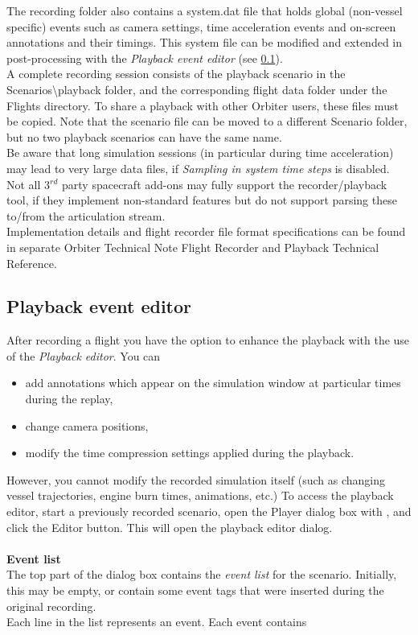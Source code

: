 \documentclass[Orbiter User Manual.tex]{subfiles}
\begin{document}
\noindent
The recording folder also contains a system.dat file that holds global (non-vessel specific) events such as camera settings, time acceleration events and on-screen annotations and their timings. This system file can be modified and extended in post-processing with the \textit{Playback event editor} (see \ref{sec:flight_playbackedit}).\\
A complete recording session consists of the playback scenario in the Scenarios\textbackslash playback folder, and the corresponding flight data folder under the Flights directory. To share a playback with other Orbiter users, these files must be copied. Note that the scenario file can be moved to a different Scenario folder, but no two playback scenarios can have the same name.\\
Be aware that long simulation sessions (in particular during time acceleration) may lead to very large data files, if \textit{Sampling in system time steps} is disabled.\\
Not all 3$^{rd}$ party spacecraft add-ons may fully support the recorder/playback tool, if they implement non-standard features but do not support parsing these to/from the articulation stream.\\
Implementation details and flight recorder file format specifications can be found in separate Orbiter Technical Note Flight Recorder and Playback Technical Reference.


\subsection{Playback event editor}
\label{sec:flight_playbackedit}
After recording a flight you have the option to enhance the playback with the use of the \textit{Playback editor}. You can

\begin{itemize}
\item add annotations which appear on the simulation window at particular times during the replay,
\item change camera positions,
\item modify the time compression settings applied during the playback.
\end{itemize}

\noindent
However, you cannot modify the recorded simulation itself (such as changing vessel trajectories, engine burn times, animations, etc.) To access the playback editor, start a previously recorded scenario, open the Player dialog box with \Ctrl{}, and click the Editor button. This will open the playback editor dialog.\\
\\
\textbf{Event list}\\
The top part of the dialog box contains the \textit{event list} for the scenario. Initially, this may be empty, or contain some event tags that were inserted during the original recording.\\
Each line in the list represents an event. Each event contains
\end{document}
